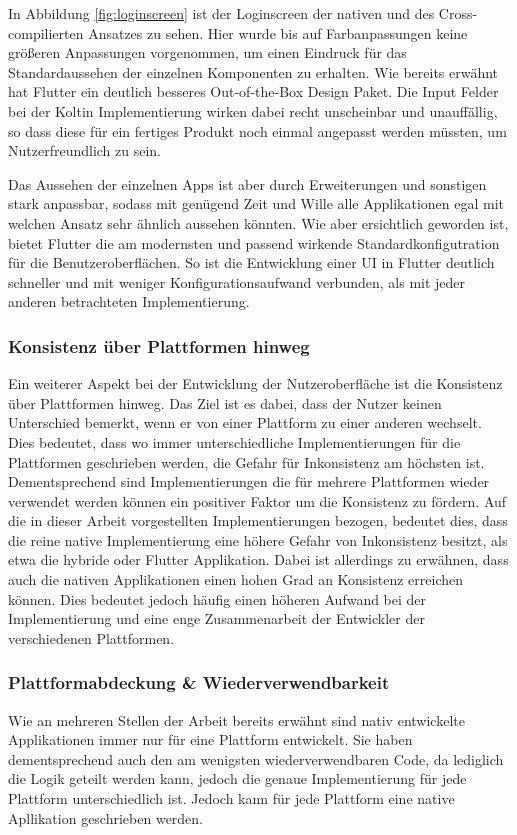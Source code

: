 In Abbildung \ref{fig:loginscreen} ist der Loginscreen der nativen und des Cross-compilierten Ansatzes zu sehen. Hier wurde bis auf Farbanpassungen keine größeren Anpassungen vorgenommen, um einen Eindruck für das Standardaussehen der einzelnen Komponenten zu erhalten. Wie bereits erwähnt hat Flutter ein deutlich besseres Out-of-the-Box Design Paket. Die Input Felder bei der Koltin Implementierung wirken dabei recht unscheinbar und unauffällig, so dass diese für ein fertiges Produkt noch einmal angepasst werden müssten, um Nutzerfreundlich zu sein.

Das Aussehen der einzelnen Apps ist aber durch Erweiterungen und sonstigen stark anpassbar, sodass mit genügend Zeit und Wille alle Applikationen egal mit welchen Ansatz sehr ähnlich aussehen könnten. Wie aber ersichtlich geworden ist, bietet Flutter die am modernsten und passend wirkende Standardkonfigutration für die Benutzeroberflächen. So ist die Entwicklung einer \ac{UI} in Flutter deutlich schneller und mit weniger Konfigurationsaufwand verbunden, als mit jeder anderen betrachteten Implementierung.

\subsubsection{Konsistenz über Plattformen hinweg}
Ein weiterer Aspekt bei der Entwicklung der Nutzeroberfläche ist die Konsistenz über Plattformen hinweg. Das Ziel ist es dabei, dass der Nutzer keinen Unterschied bemerkt, wenn er von einer Plattform zu einer anderen wechselt. 
Dies bedeutet, dass wo immer unterschiedliche Implementierungen für die Plattformen geschrieben werden, die Gefahr für Inkonsistenz am höchsten ist.
Dementsprechend sind Implementierungen die für mehrere Plattformen wieder verwendet werden können ein positiver Faktor um die Konsistenz zu fördern.
Auf die in dieser Arbeit vorgestellten Implementierungen bezogen, bedeutet dies, dass die reine native Implementierung eine höhere Gefahr von Inkonsistenz besitzt, als etwa die hybride oder Flutter Applikation.
Dabei ist allerdings zu erwähnen, dass auch die nativen Applikationen einen hohen Grad an Konsistenz erreichen können. Dies bedeutet jedoch häufig einen höheren Aufwand bei der Implementierung und eine enge Zusammenarbeit der Entwickler der verschiedenen Plattformen.

\subsubsection{Plattformabdeckung \& Wiederverwendbarkeit}
Wie an mehreren Stellen der Arbeit bereits erwähnt sind nativ entwickelte Applikationen immer nur für eine Plattform entwickelt. Sie haben dementsprechend auch den am wenigsten wiederverwendbaren Code, da lediglich die Logik geteilt werden kann, jedoch die genaue Implementierung für jede Plattform unterschiedlich ist. Jedoch kann für jede Plattform eine native Apllikation geschrieben werden.


